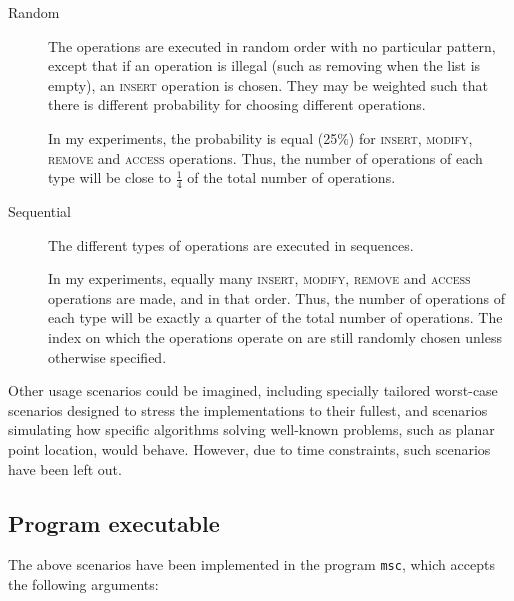 \begin{description}

  \item[Random] The operations are executed in random order with no particular
  pattern, except that if an operation is illegal (such as removing when the
  list is empty), an \textsc{insert} operation is chosen. They may be weighted
  such that there is different probability for choosing different operations.

  In my experiments, the probability is equal (25\%) for \textsc{insert},
  \textsc{modify}, \textsc{remove} and \textsc{access} operations. Thus, the
  number of operations of each type will be close to $\frac{1}{4}$ of the total
  number of operations.

  \item[Sequential] The different types of operations are executed in sequences.

  In my experiments, equally many \textsc{insert}, \textsc{modify},
  \textsc{remove} and \textsc{access} operations are made, and in that order.
  Thus, the number of operations of each type will be exactly a quarter of the
  total number of operations. The index on which the operations operate on are
  still randomly chosen unless otherwise specified.

\end{description}

Other usage scenarios could be imagined, including specially tailored worst-case
scenarios designed to stress the implementations to their fullest, and scenarios
simulating how specific algorithms solving well-known problems, such as planar
point location, would behave. However, due to time constraints, such scenarios
have been left out.

\subsection{Program executable}

The above scenarios have been implemented in the program \texttt{msc}, which
accepts the following arguments:

